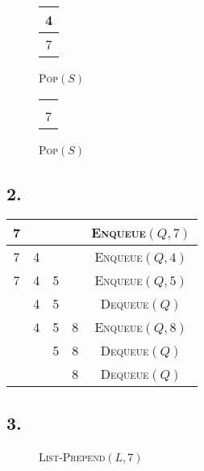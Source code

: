 \documentclass[a4paper,12pt]{article}
\begin{document}
\begin{figure}[H]
\begin{minipage}{0.133\linewidth}
\begin{tabular}{|c|}
			4 \\ \hline
			7 \\ \hline
		\end{tabular}
		\caption*{\textsc{Pop}$(S)$}
	\end{minipage}
	\begin{minipage}{0.133\linewidth}
		\centering
		\begin{tabular}{|c|}
			\hline
			\\ \hline
			\\ \hline
			7 \\ \hline
		\end{tabular}
		\caption*{\textsc{Pop}$(S)$}
	\end{minipage}
\end{figure}

\subsection*{2.}

\begin{center}
	\begin{tabular}{|c|c|c|c|c|}
		\hline
		7 & & & & \textsc{Enqueue}$(Q,7)$ \\ \hline \hline
		7 & 4 & & & \textsc{Enqueue}$(Q,4)$ \\ \hline \hline
		7 & 4 & 5 & & \textsc{Enqueue}$(Q,5)$ \\ \hline \hline
		& 4 & 5 & & \textsc{Dequeue}$(Q)$ \\ \hline \hline
		& 4 & 5 & 8 & \textsc{Enqueue}$(Q,8)$ \\ \hline \hline
		& & 5 & 8 & \textsc{Dequeue}$(Q)$ \\ \hline \hline
		& & & 8 & \textsc{Dequeue}$(Q)$ \\ \hline
	\end{tabular}
\end{center}

\subsection*{3.}

\begin{figure}[H]
	\caption*{\textsc{List-Prepend}$(L,7)$}
\end{figure}
\end{document}
